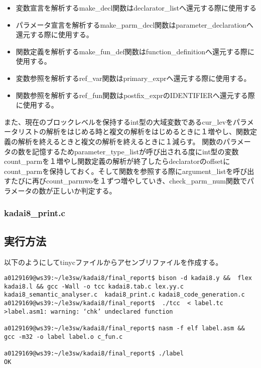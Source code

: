 \documentclass[a4paper,12pt]{jarticle}
\begin{document}
\begin{itemize}
 \item 変数宣言を解析するmake\_decl関数はdeclarator\_listへ還元する際に使用する
 \item パラメータ宣言を解析するmake\_parm\_decl関数はparameter\_declarationへ還元する際に使用する。
 \item 関数定義を解析するmake\_fun\_def関数はfunction\_definitionへ還元する際に使用する。
 \item 変数参照を解析するref\_var関数はprimary\_exprへ還元する際に使用する。
 \item 関数参照を解析するref\_fun関数はpostfix\_exprのIDENTIFIERへ還元する際に使用する。
\end{itemize}
また、現在のブロックレベルを保持するint型の大域変数であるcur\_levをパラメータリストの解析をはじめる時と複文の解析をはじめるときに１増やし、関数定義の解析を終えるときと複文の解析を終えるときに１減らす。
関数のパラメータの数を記憶するためparameter\_type\_listが呼び出される度にint型の変数count\_parmを１増やし関数定義の解析が終了したらdeclaratorのoffsetにcount\_parmを保持しておく。そして関数を参照する際にargument\_listを呼び出すたびに再びcount\_parmwoを１ずつ増やしていき、check\_parm\_num関数でパラメータの数が正しいか判定する。


\subsubsection{kadai8\_print.c}




\subsection{実行方法}
以下のようにしてtinycファイルからアセンブリファイルを作成する。
\begin{verbatim}
a0129169@ws39:~/le3sw/kadai8/final_report$ bison -d kadai8.y &&  flex kadai8.l && gcc -Wall -o tcc kadai8.tab.c lex.yy.c kadai8_semantic_analyser.c  kadai8_print.c kadai8_code_generation.c
a0129169@ws39:~/le3sw/kadai8/final_report$  ./tcc  < label.tc >label.asm1: warning: ‘chk’ undeclared function

a0129169@ws39:~/le3sw/kadai8/final_report$ nasm -f elf label.asm && gcc -m32 -o label label.o c_fun.c

a0129169@ws39:~/le3sw/kadai8/final_report$ ./label 
OK

\end{verbatim}
\end{document}
